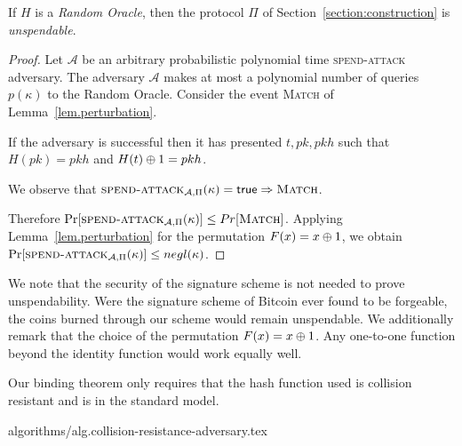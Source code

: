 \begin{theorem}[Unspendability]
  If $H$ is a \emph{Random Oracle}, then the protocol $\Pi$ of Section~\ref{section:construction} is \emph{unspendable}.
\end{theorem}
\begin{proof}
  Let $\mathcal{A}$ be an arbitrary probabilistic polynomial time \textsc{spend-attack} adversary.
  The adversary $\mathcal{A}$ makes at most a polynomial number of queries $p(\kappa)$ to the Random Oracle.
  Consider the event \textsc{Match} of Lemma~\ref{lem.perturbation}.

  If the adversary is successful then it has presented $t, pk, pkh$ such that $H(pk) = pkh$ and $H(t) \oplus 1 = pkh$.

  We observe that $\textsc{spend-attack}_{\mathcal{A}, \Pi}(\kappa) = \mathsf{true} \Rightarrow \textsc{Match}$.

  Therefore $\Pr[\textsc{spend-attack}_{\mathcal{A}, \Pi}(\kappa)] \leq Pr[\textsc{Match}]$. Applying Lemma~\ref{lem.perturbation} for the permutation $F(x) = x \oplus 1$,
  we obtain
  $\Pr[\textsc{spend-attack}_{\mathcal{A}, \Pi}(\kappa)] \leq negl(\kappa)$.
\end{proof}

We note that the security of the signature scheme is not needed to prove unspendability. Were the signature scheme of Bitcoin ever found to be forgeable, the coins burned through our scheme would remain unspendable. We additionally remark that the
choice of the permutation $F(x) = x \oplus 1$. Any one-to-one
function beyond the identity function would work equally well.

Our binding theorem only requires that the hash function used is collision
resistant and is in the standard model.

{algorithms/alg.collision-resistance-adversary.tex}

